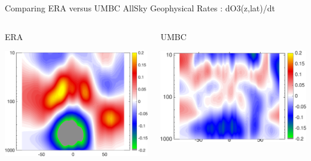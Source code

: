 \documentclass[10pt,t]{beamer}
\begin{document}
\begin{frame}{Comparing ERA versus UMBC AllSky Geophysical Rates : dO3(z,lat)/dt}
\vspace{-0.35in}

\begin{columns}
\begin{column}{0.55\columnwidth}
\begin{block}{\footnotesize ERA}
\vspace{-0.1in}
\begin{center}
\includegraphics[width=0.925\linewidth]{Figs/CloudAnom/Desc_ocean/ak_x_ERAo3rates.png}
\end{center}
\end{block}
\end{column}

\begin{column}{0.55\columnwidth}
\begin{block}{\footnotesize UMBC}
\vspace{-0.1in}
\begin{center}
\includegraphics[width=\linewidth]{Figs/CloudAnom/Desc_ocean/o3_lat_p_rates_from_obs_specral_rates.png}
\end{center}
\end{block}
\end{column}
\end{columns}


\end{frame}
\end{document}
